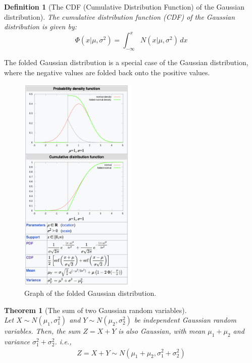 \documentclass[11pt]{book} %
\newtheorem{theorem}{Theorem}[section]
\newtheorem{definition}{Definition}[section]
\begin{document}
\begin{definition}[The CDF (Cumulative Distribution Function) of the Gaussian distribution]
    The cumulative distribution function (CDF) of the Gaussian distribution is given by:
    \begin{equation}
        \Phi(x | \mu, \sigma^2) = \int_{-\infty}^{x} N(x | \mu, \sigma^2) \, dx
    \end{equation}
    
\end{definition}


The folded Gaussian distribution is a special case of the Gaussian distribution, where the negative values are folded back onto the positive values.
\begin{figure}[h]
    \centering
    \includegraphics[width=0.5\textwidth]{Figs/folded_gaussian.png}
    \caption{Graph of the folded Gaussian distribution.}
    \label{fig:gaussian}
\end{figure}


\begin{theorem}[The sum of two Gaussian random variables]\ \\
    Let \(X \sim N(\mu_1, \sigma_1^2)\) and \(Y \sim N(\mu_2, \sigma_2^2)\) be independent Gaussian random variables. 
    Then, the sum \(Z = X + Y\) is also Gaussian, with mean \(\mu_1 + \mu_2\) and variance \(\sigma_1^2 + \sigma_2^2\). i.e., 
    \begin{align*}
        Z = X + Y \sim N(\mu_1 + \mu_2, \sigma_1^2 + \sigma_2^2)
    \end{align*}
\end{theorem}
\end{document}

